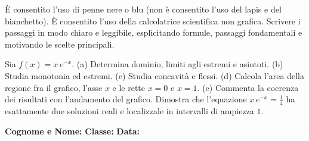 \documentclass[a4paper,10pt]{exam}
\begin{document}
\begin{tcolorbox}[istruzionibox]
È consentito l'uso di penne nere o blu (non è consentito l'uso del lapis e del bianchetto).
È consentito l'uso della calcolatrice scientifica non grafica.
Scrivere i passaggi in modo chiaro e leggibile, esplicitando formule, passaggi fondamentali e motivando le scelte principali.
\end{tcolorbox}

\vspace{1.5mm}


\begin{questions}
\question Sia $f(x)=x\,e^{-x}$. (a) Determina dominio, limiti agli estremi e asintoti. (b) Studia monotonia ed estremi. (c) Studia concavità e flessi. (d) Calcola l'area della regione fra il grafico, l'asse $x$ e le rette $x=0$ e $x=1$. (e) Commenta la coerenza dei risultati con l'andamento del grafico.
\question Dimostra che l'equazione $x\,e^{-x}=\tfrac14$ ha esattamente due soluzioni reali e localizzale in intervalli di ampiezza $1$.
\end{questions}
\null
\vfill

\noindent
\textbf{Cognome e Nome:}\enspace\hrulefill\hspace{1cm}%
\textbf{Classe:}\enspace\makebox[2.5cm]{\hrulefill}\hspace{1cm}%
\textbf{Data:}\enspace\makebox[2.5cm]{\hrulefill}

\vspace{3mm}
\end{document}
